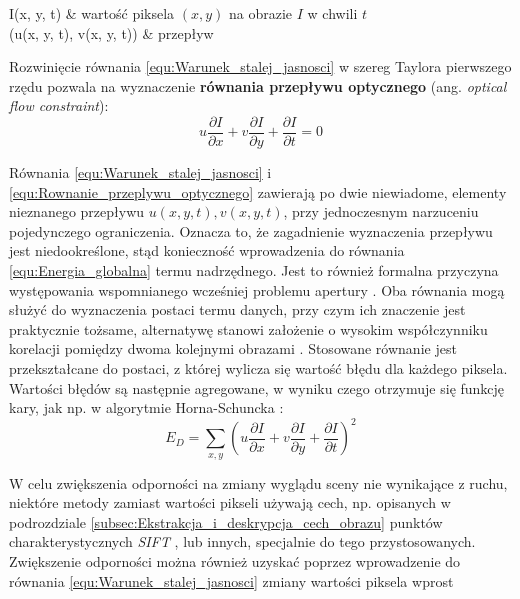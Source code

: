 \begin{conditions}
	I(x, y, t) & wartość piksela $(x, y)$ na obrazie $I$ w chwili $t$ \\
	(u(x, y, t), v(x, y, t)) & przepływ \\
\end{conditions}

Rozwinięcie równania \ref{equ:Warunek_stalej_jasnosci} w szereg Taylora pierwszego rzędu pozwala na wyznaczenie \textbf{równania przepływu optycznego} (ang. \textit{optical flow constraint}):
\begin{equation}
\label{equ:Rownanie_przeplywu_optycznego}
	u \frac{\partial I}{\partial x} + v \frac{\partial I}{\partial y} + \frac{\partial I}{\partial t} = 0
\end{equation}

Równania \ref{equ:Warunek_stalej_jasnosci} i \ref{equ:Rownanie_przeplywu_optycznego} zawierają po dwie niewiadome, elementy nieznanego przepływu $u(x, y, t), v(x, y, t)$, przy jednoczesnym narzuceniu pojedynczego ograniczenia. Oznacza to, że zagadnienie wyznaczenia przepływu jest niedookreślone, stąd konieczność wprowadzenia do równania \ref{equ:Energia_globalna} termu nadrzędnego. Jest to również formalna przyczyna występowania wspomnianego wcześniej problemu apertury \cite{Baker2011}. Oba równania mogą służyć do wyznaczenia postaci termu danych, przy czym ich znaczenie jest praktycznie tożsame, alternatywę stanowi założenie o wysokim współczynniku korelacji pomiędzy dwoma kolejnymi obrazami \cite{Baker2011}. Stosowane równanie jest przekształcane do postaci, z której wylicza się wartość błędu dla każdego piksela. Wartości błędów są następnie agregowane, w wyniku czego otrzymuje się funkcję kary, jak np. w algorytmie Horna-Schuncka \cite{Horn1981} \cite{Baker2011} \cite{Karasulu2013}:
\begin{equation}
\label{equ:Funkcja_kary}
	E_D = \sum\limits_{x,y} (u \frac{\partial I}{\partial x} + v \frac{\partial I}{\partial y} + \frac{\partial I}{\partial t})^2
\end{equation}

W celu zwiększenia odporności na zmiany wyglądu sceny nie wynikające z ruchu, niektóre metody zamiast wartości pikseli używają cech, np. opisanych w podrozdziale \ref{subsec:Ekstrakcja_i_deskrypcja_cech_obrazu} punktów charakterystycznych \textit{SIFT} \cite{Baker2011}, lub innych, specjalnie do tego przystosowanych. 
Zwiększenie odporności można również uzyskać poprzez wprowadzenie do równania \ref{equ:Warunek_stalej_jasnosci} zmiany wartości piksela wprost \cite{Baker2011}

